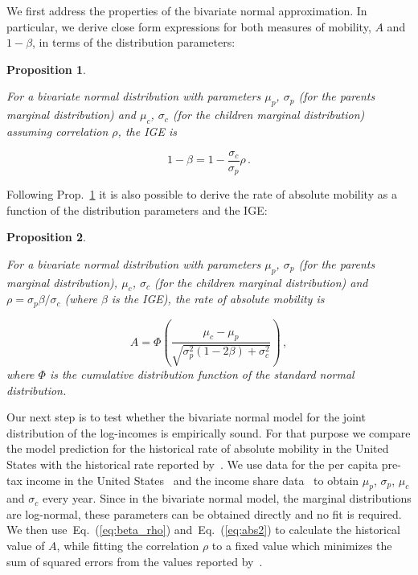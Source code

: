 \documentclass[12pt,times,letter]{article}
\newtheorem{proposition}{Proposition}
\newcommand{\elabel}[1]{\label{eq:#1}}
\newcommand{\eref}[1]{Eq.~(\ref{eq:#1})}
\newcommand{\pref}[1]{Prop.~\ref{prop:#1}}
\newcommand{\be}{\begin{equation}}
\newcommand{\ee}{\end{equation}}
\numberwithin{equation}{section}
\begin{document}
We first address the properties of the bivariate normal approximation. In particular, we derive close form expressions for both measures of mobility, $A$ and $1-\beta$, in terms of the distribution parameters:

\begin{proposition}
\label{prop:prop1}

For a bivariate normal distribution with parameters $\mu_p$, $\sigma_p$ (for the parents marginal distribution) and $\mu_c$, $\sigma_c$ (for the children marginal distribution) assuming correlation $\rho$, the IGE is

\be
1-\beta = 1-\frac{\sigma_c}{\sigma_p}\rho \,.
\elabel{beta_rho}
\ee
\end{proposition}

Following \pref{prop1} it is also possible to derive the rate of absolute mobility as a function of the distribution parameters and the IGE:

\begin{proposition}
\label{prop:prop2}

For a bivariate normal distribution with parameters $\mu_p$, $\sigma_p$ (for the parents marginal distribution), $\mu_c$, $\sigma_c$ (for the children marginal distribution) and $\rho=\sigma_p\beta/\sigma_c$ (where $\beta$ is the IGE), the rate of absolute mobility is

\be
A = \Phi\left(\frac{\mu_c - \mu_p}{\sqrt{\sigma_p^2\left(1 - 2\beta\right) + \sigma_c^2}}\right) \,,
\elabel{abs2}
\ee
where $\Phi$ is the cumulative distribution function of the standard normal distribution.
\end{proposition}

Our next step is to test whether the bivariate normal model for the joint distribution of the log-incomes is empirically sound. For that purpose we compare the model prediction for the historical rate of absolute mobility in the United States with the historical rate reported by~\citet{chetty2017fading}. We use data for the per capita pre-tax income in the United States~\citep{PikettyZucman2014} and the income share data~\citep{WID2017} to obtain $\mu_p$, $\sigma_p$, $\mu_c$ and $\sigma_c$ every year. Since in the bivariate normal model, the marginal distributions are log-normal, these parameters can be obtained directly and no fit is required. We then use~\eref{beta_rho} and~\eref{abs2} to calculate the historical value of $A$, while fitting the correlation $\rho$ to a fixed value which minimizes the sum of squared errors from the values reported by~\citet{chetty2017fading}.
\end{document}
